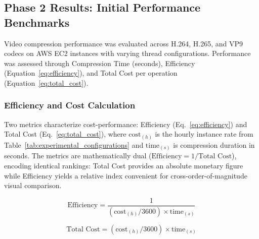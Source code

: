 \documentclass[conference]{IEEEtran}
\begin{document}
\subsection{Phase 2 Results: Initial Performance Benchmarks}

Video compression performance was evaluated across H.264, H.265, and VP9
codecs on AWS EC2 instances with varying thread configurations. Performance was
assessed through Compression Time (seconds), Efficiency
(Equation~\ref{eq:efficiency}), and Total Cost per operation
(Equation~\ref{eq:total_cost}).

\subsubsection{Efficiency and Cost Calculation}

Two metrics characterize cost-performance: Efficiency (Eq.~\ref{eq:efficiency}) and Total Cost (Eq.~\ref{eq:total_cost}), where $\text{cost}_{(h)}$ is the hourly instance rate from Table~\ref{tab:experimental_configurations} and $\text{time}_{(s)}$ is compression duration in seconds. The metrics are mathematically dual ($\text{Efficiency} = 1/\text{Total Cost}$), encoding identical rankings: Total Cost provides an absolute monetary figure while Efficiency yields a relative index convenient for cross-order-of-magnitude visual comparison.

\begin{equation}
	\text{Efficiency} = \frac{1}{(\text{cost}_{(h)}/3600) \times \text{time}_{(s)}}
	\label{eq:efficiency}
\end{equation}

\begin{equation}
	\text{Total Cost} = (\text{cost}_{(h)}/3600) \times \text{time}_{(s)}
	\label{eq:total_cost}
\end{equation}
\end{document}
